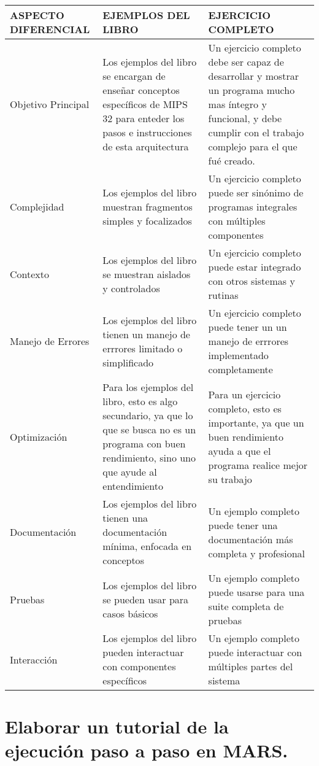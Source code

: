 \documentclass{article}
\begin{document}
\begin{tabular}{| p{3cm} |p{4cm} | p{5cm} |}
    \hline
    ASPECTO DIFERENCIAL & EJEMPLOS DEL LIBRO & EJERCICIO COMPLETO \\
    \hline
    Objetivo Principal & Los ejemplos del libro se encargan de enseñar conceptos específicos de MIPS 32 para enteder los pasos e instrucciones de esta arquitectura & Un ejercicio completo debe ser capaz de desarrollar y mostrar un programa mucho mas íntegro y funcional, y debe cumplir con el trabajo complejo para el que fué creado.
\\
    \hline
    Complejidad & Los ejemplos del libro muestran fragmentos simples y focalizados & Un  ejercicio completo puede ser sinónimo de programas integrales con múltiples componentes \\
    \hline
    Contexto &  Los ejemplos del libro se muestran aislados y controlados & Un  ejercicio completo puede estar integrado con otros sistemas y rutinas \\
    \hline
    Manejo de Errores & Los ejemplos del libro tienen un manejo de errrores limitado o simplificado & Un  ejercicio completo puede tener un un manejo de errrores implementado completamente \\
    \hline
    Optimización & Para los ejemplos del libro, esto es algo secundario, ya que lo que se busca no es un programa con buen rendimiento, sino uno que ayude al entendimiento	 & Para un ejercicio completo, esto es importante, ya que un buen rendimiento ayuda a que el programa realice mejor su trabajo \\
    \hline
    Documentación & Los ejemplos del libro tienen una documentación mínima, enfocada en conceptos & Un ejemplo completo puede tener una documentación más completa y profesional
 \\
    \hline
    Pruebas & Los ejemplos del libro se pueden usar para casos básicos & Un ejemplo completo puede usarse para una suite completa de pruebas
 \\
    \hline
    Interacción & Los ejemplos del libro pueden interactuar con componentes específicos & Un ejemplo completo puede interactuar con múltiples partes del sistema
 \\
    \hline
\end{tabular}

\quad
\newpage

\section{Elaborar un tutorial de la ejecución paso a paso en MARS.}
\end{document}
